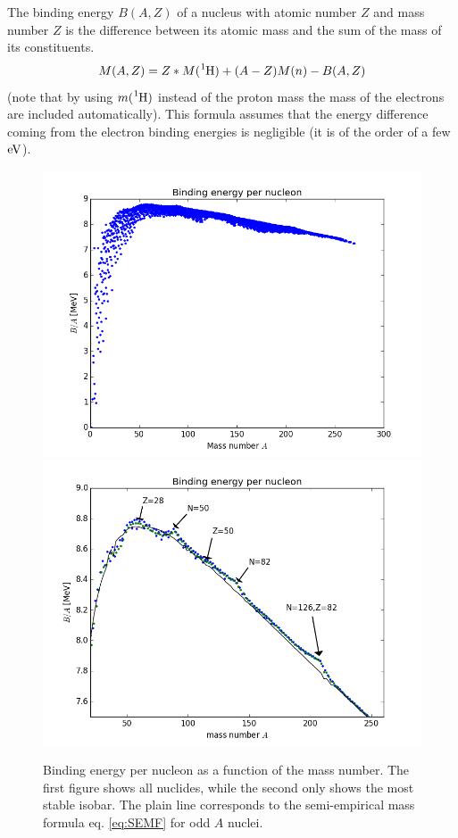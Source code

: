 \documentclass[12pt]{article}
\begin{document}
The binding energy $B(A,Z)$ of a nucleus with atomic number $Z$ and mass number $Z$ is the difference between its atomic mass and the sum of the mass of its constituents. 
\[M(A,Z)=Z*M(\ce{^{1}H})+(A-Z)M(n)-B(A,Z)\]
(note that by using $m(\ce{^{1}H})$ instead of the proton mass the mass of the electrons are included automatically). This formula assumes that the energy difference coming from the electron binding energies is negligible (it is of the order of a few $\rm{eV}$). 

\begin{figure}
\includegraphics[scale=0.4]{images/BindingEnergyAll.png}
\includegraphics[scale=0.4]{images/BindingEnergyMostStable.png}
\caption{Binding energy per nucleon as a function of the mass number. The first figure shows all nuclides, while the second only shows the most stable isobar. The plain line corresponds to the semi-empirical mass formula eq. \ref{eq:SEMF} for odd $A$ nuclei.}\label{fig:bindingEnergies}
\end{figure}
\end{document}
